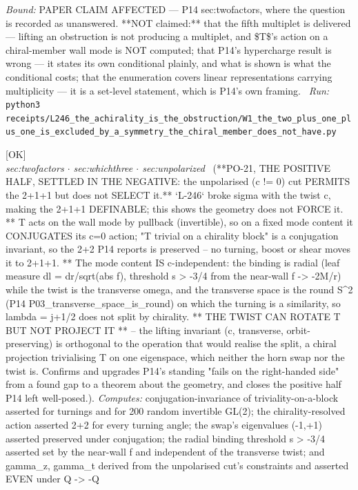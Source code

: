 \begin{description}
 \emph{Bound:} PAPER CLAIM AFFECTED --- P14 sec:twofactors, where the question is recorded as unanswered. **NOT claimed:** that the fifth multiplet is delivered --- lifting an obstruction is not producing a multiplet, and \$T\$'s action on a chiral-member wall mode is NOT computed; that P14's hypercharge result is wrong --- it states its own conditional plainly, and what is shown is what the conditional costs; that the enumeration covers linear representations carrying multiplicity --- it is a set-level statement, which is P14's own framing.
\ \emph{Run:} \texttt{python3 receipts/L246\_the\_achirality\_is\_the\_obstruction/W1\_the\_two\_plus\_one\_plus\_one\_is\_excluded\_by\_a\_symmetry\_the\_chiral\_member\_does\_not\_have.py}
\item[\label{rcpt:P14_the_twist_conjugates_T_it_does_not_project_it}\texttt{P14\_the\_twist\_conjugates\_T\_it\_does\_not\_project\_it}]\hfill\textsf{[OK]}\\
\textit{sec:twofactors \ensuremath{\cdot} sec:whichthree \ensuremath{\cdot} sec:unpolarized} \ (**PO-21, THE POSITIVE HALF, SETTLED IN THE NEGATIVE: the unpolarised (c != 0) cut PERMITS the 2+1+1 but does not SELECT it.** `L-246` broke sigma with the twist c, making the 2+1+1 DEFINABLE; this shows the geometry does not FORCE it. ** T acts on the wall mode by pullback (invertible), so on a fixed mode content it CONJUGATES its c=0 action; "T trivial on a chirality block" is a conjugation invariant, so the 2+2 P14 reports is preserved -- no turning, boost or shear moves it to 2+1+1. ** The mode content IS c-independent: the binding is radial (leaf measure dl = dr/sqrt(abs f), threshold s > -3/4 from the near-wall f -> -2M/r) while the twist is the transverse omega, and the transverse space is the round S\textasciicircum{}2 (P14 P03\_transverse\_space\_is\_round) on which the turning is a similarity, so lambda = j+1/2 does not split by chirality. ** THE TWIST CAN ROTATE T BUT NOT PROJECT IT ** -- the lifting invariant (c, transverse, orbit-preserving) is orthogonal to the operation that would realise the split, a chiral projection trivialising T on one eigenspace, which neither the horn swap nor the twist is. Confirms and upgrades P14's standing "fails on the right-handed side" from a found gap to a theorem about the geometry, and closes the positive half P14 left well-posed.). 
\emph{Computes:} conjugation-invariance of triviality-on-a-block asserted for turnings and for 200 random invertible GL(2); the chirality-resolved action asserted 2+2 for every turning angle; the swap's eigenvalues (-1,+1) asserted preserved under conjugation; the radial binding threshold s > -3/4 asserted set by the near-wall f and independent of the transverse twist; and gamma\_z, gamma\_t derived from the unpolarised cut's constraints and asserted EVEN under Q -> -Q

\end{description}
